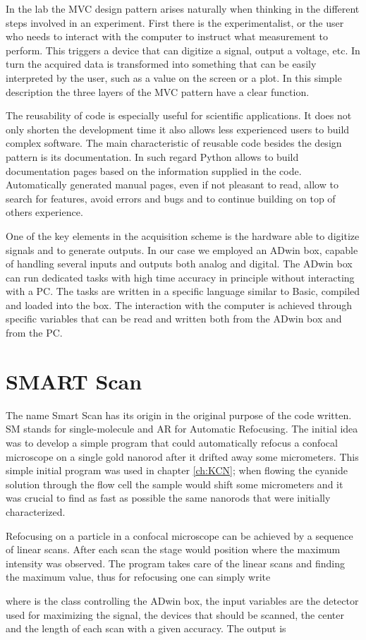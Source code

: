 In the lab the MVC design pattern arises naturally when thinking in the
different steps involved in an experiment. First there is the experimentalist,
or the user who needs to interact with the computer to instruct what measurement
to perform. This triggers a device that can digitize a signal, output a
voltage, etc. In turn the acquired data is transformed into something that can
be easily interpreted by the user, such as a value on the screen or a plot. In
this simple description the three layers of the MVC pattern have a clear
function. 

The reusability of code is especially useful for scientific applications. It
does not only shorten the development time it also allows less experienced users
to build complex software. The main characteristic of reusable code besides
the design pattern is its documentation. In such regard Python allows to build
documentation pages based on the information supplied in the code.
Automatically generated manual pages, even if not pleasant to read, allow to
search for features, avoid errors and bugs and to continue building on top of
others experience. 

One of the key elements in the acquisition scheme is the hardware able to
digitize signals and to generate outputs. In our case we employed an ADwin box,
capable of handling several inputs and outputs both analog and digital. The
ADwin box can run dedicated tasks with high time accuracy in principle without
interacting with a PC. The tasks are written in a specific language similar to
Basic, compiled and loaded into the box. The interaction with the computer is
achieved through specific variables that can be read and written both from the
ADwin box and from the PC.

\section{SMART Scan}
The name Smart Scan has its origin in the original purpose of the code written.
SM stands for single-molecule and AR for Automatic Refocusing. The initial idea
was to develop a simple program that could automatically refocus a confocal
microscope on a single gold nanorod after it drifted away some micrometers. This
simple initial program was used in chapter \ref{ch:KCN}; when flowing the
cyanide solution through the flow cell the sample would shift some micrometers
and it was crucial to find as fast as possible the same nanorods that were
initially characterized. 

Refocusing on a particle in a confocal microscope can be achieved by a sequence
of linear scans. After each scan the stage would position where the maximum
intensity was observed. The program takes care of the linear scans and finding
the maximum value, thus for refocusing one can simply write 


\noindent where  is the class controlling the ADwin box, the input
variables are the detector used for maximizing the signal, the devices that
should be scanned, the center and the length of each scan with a given accuracy.
The output is 
